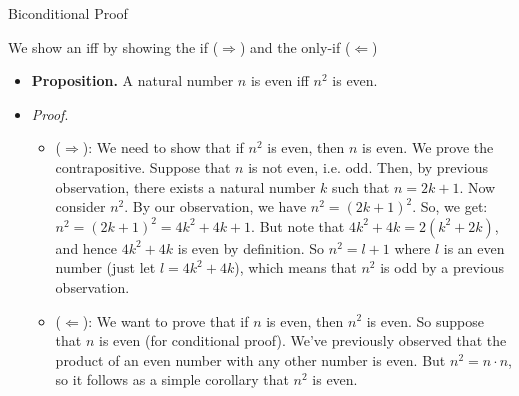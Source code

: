 \documentclass[../slides.tex]{subfiles}
\begin{document}
\begin{frame}{Biconditional Proof}

We show an iff by showing the if ($\Rightarrow$) and the only-if ($\Leftarrow$)

\begin{itemize}

	\item \textbf{Proposition.} A natural number $n$ is even iff $n^2$ is even.

	\item \emph{Proof}.
					
					\begin{itemize}
					
						\item ($\Rightarrow$): We need to show that if $n^2$ is even, then $n$ is even. We prove the contrapositive. Suppose that $n$ is not even, i.e. odd. Then, by previous observation, there exists a natural number $k$ such that $n=2k+1$. Now consider $n^2$. By our observation, we have $n^2=(2k+1)^2$. So, we get: $n^2=(2k+1)^2=4k^2+4k+1$. But note that $4k^2+4k=2(k^2+2k)$, and hence $4k^2+4k$ is even by definition. So $n^2=l+1$ where $l$ is an even number (just let $l=4k^2+4k$), which means that $n^2$ is odd by a previous observation. 
						
						\item ($\Leftarrow$): We want to prove that if $n$ is even, then $n^2$ is even. So suppose that $n$ is even (for conditional proof). We've previously observed that the product of an even number with any other number is even. But $n^2=n\cdot n$, so it follows as a simple corollary that $n^2$ is even.
											
					\end{itemize}

\end{itemize}

\end{frame}
\end{document}
